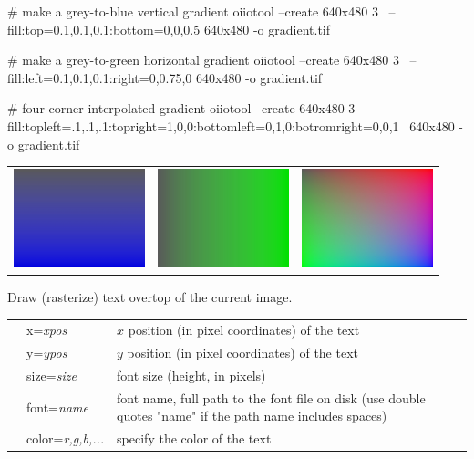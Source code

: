 \begin{smallcode}
    # make a grey-to-blue vertical gradient
    oiiotool --create 640x480 3 \
        --fill:top=0.1,0.1,0.1:bottom=0,0,0.5 640x480 -o gradient.tif

    # make a grey-to-green horizontal gradient
    oiiotool --create 640x480 3 \
        --fill:left=0.1,0.1,0.1:right=0,0.75,0 640x480 -o gradient.tif
\end{smallcode}
\begin{tinycode}
    # four-corner interpolated gradient
    oiiotool --create 640x480 3 \
        -fill:topleft=.1,.1,.1:topright=1,0,0:bottomleft=0,1,0:botromright=0,0,1 \
            640x480 -o gradient.tif
\end{tinycode}
\noindent \begin{tabular}{lll}
\includegraphics[width=1.5in]{figures/gradient.jpg} &
 \includegraphics[width=1.5in]{figures/gradienth.jpg} &
 \includegraphics[width=1.5in]{figures/gradient4.jpg}
\end{tabular}

\apiend


Draw (rasterize) text overtop of the current image.

\begin{tabular}{p{10pt} p{1in} p{3.75in}}
 & {\cf x=}\emph{xpos} & $x$ position (in pixel coordinates) of the text \\
 & {\cf y=}\emph{ypos} & $y$ position (in pixel coordinates) of the text  \\
 & {\cf size=}\emph{size} & font size (height, in pixels) \\
 & {\cf font=}\emph{name} & font name, full path to the font file on
  disk (use double quotes {\cf "name"} if the path name includes spaces) \\
 & {\cf color=}\emph{r,g,b,...} & specify the color of the text \\
\end{tabular}

